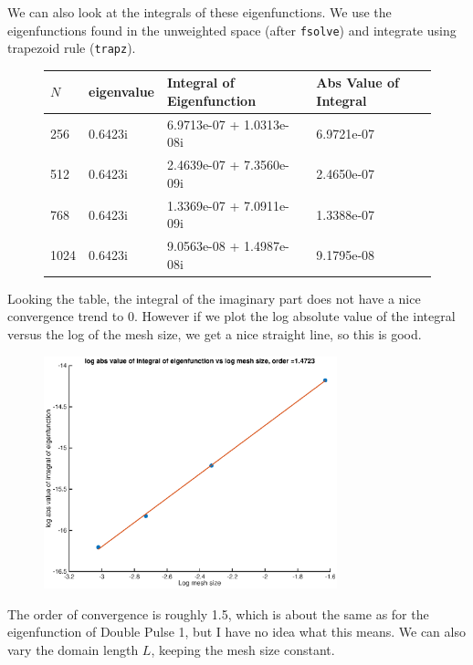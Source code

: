\documentclass[12pt]{article}
\begin{document}
We can also look at the integrals of these eigenfunctions. We use the eigenfunctions found in the unweighted space (after \texttt{fsolve}) and integrate using trapezoid rule (\texttt{trapz}). 
\begin{figure}[H]
\begin{tabular}{l|lll}
  $N$   & eigenvalue &  Integral of Eigenfunction & Abs Value of Integral \\ \hline
  256   & 0.6423i  &  6.9713e-07 + 1.0313e-08i & 6.9721e-07 \\ 
  512   & 0.6423i  &  2.4639e-07 + 7.3560e-09i & 2.4650e-07 \\ 
  768   & 0.6423i  &  1.3369e-07 + 7.0911e-09i & 1.3388e-07 \\
  1024  & 0.6423i  &  9.0563e-08 + 1.4987e-08i & 9.1795e-08 \\
\end{tabular}
\end{figure}

Looking the table, the integral of the imaginary part does not have a nice convergence trend to 0. However if we plot the log absolute value of the integral versus the log of the mesh size, we get a nice straight line, so this is good.

\begin{figure}[H]
\includegraphics[width=8.5cm]{1double2fouriereigenfnabsintegralN}
\end{figure}

The order of convergence is roughly 1.5, which is about the same as for the eigenfunction of Double Pulse 1, but I have no idea what this means. We can also vary the domain length $L$, keeping the mesh size constant.
\end{document}
